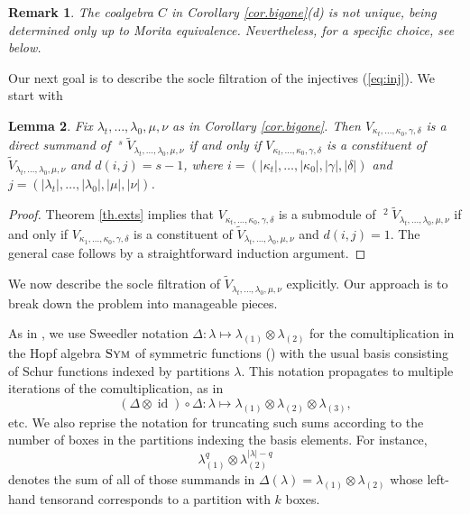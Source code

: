 \documentclass[11pt]{article}
\theoremstyle{plain}
\newtheorem{lemma}{Lemma}[section]
\theoremstyle{nonumberplain}
\theoremstyle{plain}
\newtheorem{remark}[lemma]{Remark}
\theoremstyle{nonumberplain}
\newtheorem{proof}{Proof}
\DeclareMathOperator{\id}{id}
\DeclareMathOperator{\usoc}{\underline{\mathrm{soc}}}
\DeclareMathOperator{\sym}{\cat{Sym}}
\newcommand{\cat}[1]{\textsc{#1}}
\begin{document}
\begin{remark}\label{re.not-unique}
  The coalgebra $C$ in Corollary \ref{cor.bigone}(d) is not unique, being
  determined only up to Morita equivalence. Nevertheless, for a
  specific choice, see  below.
\end{remark}



Our next goal is to describe the socle filtration of the injectives (\ref{eq:inj}).  We start with

\begin{lemma}\label{lem:blah}
	Fix $\lambda_t,\ldots,\lambda_0,\mu,\nu$ as in Corollary \ref{cor.bigone}.  Then $V_{\kappa_t,\ldots,\kappa_0,\gamma,\delta}$ is a direct summand of $\usoc^s\widetilde{V}_{\lambda_t,\ldots,\lambda_0,\mu,\nu}$ if and only if $V_{\kappa_t,\ldots,\kappa_0,\gamma,\delta}$ is a constituent of $\tilde{V}_{\lambda_t,\ldots,\lambda_0,\mu,\nu}$ and $d(i,j)=s-1$, where $i=\left(|\kappa_t|,\ldots,|\kappa_0|,|\gamma|,|\delta|\right)$ and $j=\left(|\lambda_t|,\ldots,|\lambda_0|,|\mu|,|\nu|\right)$.
\end{lemma}

\begin{proof}
	Theorem \ref{th.exts} implies that $V_{\kappa_t,\ldots,\kappa_0,\gamma,\delta}$ is a submodule of $\usoc^2 \tilde{V}_{\lambda_t,\ldots,\lambda_0,\mu,\nu}$ if and only if $V_{\kappa_1,\ldots,\kappa_0,\gamma,\delta}$ is a constituent of $\tilde{V}_{\lambda_t,\ldots,\lambda_0,\mu,\nu}$ and $d(i,j)=1$.  The general case follows by a straightforward induction argument.
\end{proof}

We now describe the socle filtration of $\tilde{V}_{\lambda_t,\ldots,\lambda_0,\mu,\nu}$ explicitly.  Our approach is to break down the problem into manageable pieces.



As in \cite[$\S$3.2]{us2}, we
use Sweedler notation $\Delta:\lambda\mapsto
\lambda_{(1)}\otimes\lambda_{(2)}$ for the comultiplication in the
Hopf algebra $\sym$ of symmetric functions (\cite{sym}) with the usual
basis consisting of Schur functions indexed by partitions
$\lambda$. This notation propagates to multiple iterations of the
comultiplication, as in 
\begin{equation*}
  (\Delta\otimes\id)\circ\Delta:\lambda\mapsto \lambda_{(1)}\otimes \lambda_{(2)}\otimes\lambda_{(3)},
\end{equation*}
etc. We also reprise the notation for truncating such sums according
to the number of boxes in the partitions indexing the basis
elements. For instance, 
\begin{equation*}
  \lambda_{(1)}^q\otimes\lambda_{(2)}^{|\lambda|-q}
\end{equation*}
denotes the sum of all of those summands in
$\Delta(\lambda)=\lambda_{(1)}\otimes\lambda_{(2)}$ whose left-hand
tensorand corresponds to a partition with $k$ boxes. 
\end{document}
